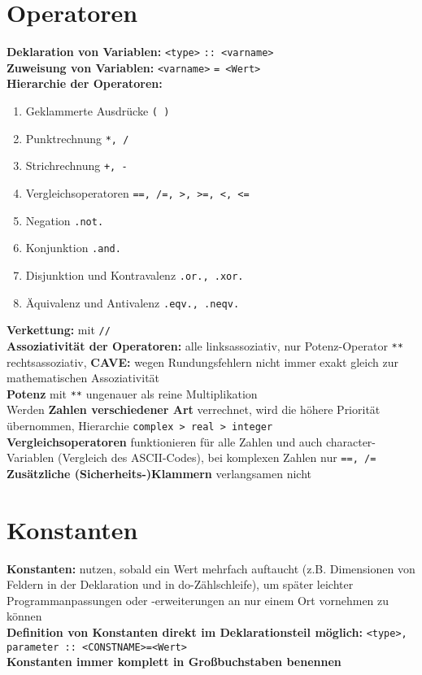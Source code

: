 \documentclass[a4paper, twocolumn]{scrarticle}
\begin{document}
\section{Operatoren}
\textbf{Deklaration von Variablen:} \lstinline|<type>| \lstinline|:: <varname>|\\
\textbf{Zuweisung von Variablen:} \lstinline|<varname>| \lstinline|= <Wert>|\\
\textbf{Hierarchie der Operatoren:}
\begin{enumerate}
  \item Geklammerte Ausdrücke \lstinline|( )|
  \item Punktrechnung \lstinline|*, /|
  \item Strichrechnung \lstinline|+, -|
  \item Vergleichsoperatoren \lstinline[style=neutral]|==, /=, >, >=, <, <=|
  \item Negation \lstinline|.not.|
  \item Konjunktion \lstinline|.and.|
  \item Disjunktion und Kontravalenz \lstinline|.or., .xor.|
  \item Äquivalenz und Antivalenz \lstinline|.eqv., .neqv.|
\end{enumerate}
\textbf{Verkettung:} mit \lstinline|//|\\
\textbf{Assoziativität der Operatoren:} alle linksassoziativ, nur Potenz-Operator \lstinline|**| rechtsassoziativ, \textbf{CAVE:} wegen Rundungsfehlern nicht immer exakt gleich zur mathematischen Assoziativität\\
\textbf{Potenz} mit \lstinline|**| ungenauer als reine Multiplikation\\
Werden \textbf{Zahlen verschiedener Art} verrechnet, wird die höhere Priorität übernommen, Hierarchie \lstinline|complex > real > integer|\\
\textbf{Vergleichsoperatoren} funktionieren für alle Zahlen und auch character-Variablen (Vergleich des ASCII-Codes), bei komplexen Zahlen nur \lstinline|==, /=|\\
\textbf{Zusätzliche (Sicherheits-)Klammern} verlangsamen nicht

\section{Konstanten}
\textbf{Konstanten:} nutzen, sobald ein Wert mehrfach auftaucht (z.B. Dimensionen von Feldern in der Deklaration und in do-Zählschleife), um später leichter Programmanpassungen oder -erweiterungen an nur einem Ort vornehmen zu können\\
\textbf{Definition von Konstanten direkt im Deklarationsteil möglich:} \lstinline|<type>, parameter :: <CONSTNAME>=<Wert>| \\
\textbf{Konstanten immer komplett in Großbuchstaben benennen}
\end{document}
